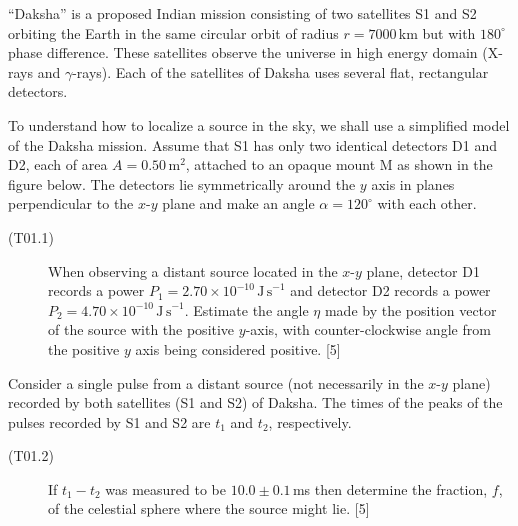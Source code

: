 ``Daksha'' is a proposed Indian mission consisting of two satellites S1 and
S2 orbiting the Earth in the same circular orbit of radius $r = 7000$\,km but
with $180^\circ$ phase difference. These satellites observe the universe in
high energy domain (X-rays and $\gamma$-rays). Each of the satellites of
Daksha uses several flat, rectangular detectors.

To understand how to localize a source in the sky, we shall use a simplified
model of the Daksha mission. Assume that S1 has only two identical detectors
D1 and D2, each of area $A = 0.50\,\mathrm{m}^2$, attached to an opaque mount
M as shown in the figure below. The detectors lie symmetrically around the
$y$ axis in planes perpendicular to the $x$-$y$ plane and make an angle
$\alpha = 120^\circ$ with each other.


\begin{description}
\item[(T01.1)] When observing a distant source located in the $x$-$y$ plane,
  detector D1 records a power $P_1 = 2.70 \times 10^{-10}\,\mathrm{J\,s}^{-1}$
  and detector D2 records a power
  $P_2 = 4.70 \times 10^{-10}\,\mathrm{J\,s}^{-1}$. Estimate the angle $\eta$
  made by the position vector of the source with the positive $y$-axis, with
  counter-clockwise angle from the positive $y$ axis being considered
  positive. \hfill[5]
\end{description}

Consider a single pulse from a distant source (not necessarily in the
$x$-$y$ plane) recorded by both satellites (S1 and S2) of Daksha. The times
of the peaks of the pulses recorded by S1 and S2 are $t_1$ and $t_2$,
respectively.

\begin{description}
\item[(T01.2)] If $t_1 - t_2$ was measured to be $10.0 \pm 0.1$\,ms then
  determine the fraction, $f$, of the celestial sphere where the source
  might lie. \hfill[5]
\end{description}
